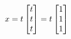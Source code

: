 \documentclass[preview]{standalone}
\begin{document}
\begin{align*}
\special{dvisvgm:raw <g id='unique000'>}x = t \begin{bmatrix} t \\ t \\ t \end{bmatrix} = t \begin{bmatrix} 1 \\ 1 \\ 1 \end{bmatrix}\special{dvisvgm:raw </g>}
\end{align*}
\end{document}
